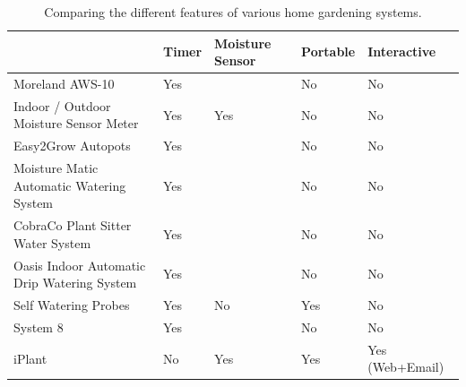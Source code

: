 \documentclass{ubicomp2012}
\begin{document}
\begin{table}
\begin{center}
\renewcommand{\arraystretch}{1.5}
\begin{tabular}{| p{7cm} | p{2cm} |p{2.5cm}  | p{2cm} | p{2cm} |}
\hline
                                                    & Timer                        & Moisture Sensor                        & Portable  & Interactive \\ \hline
        Moreland AWS-10                             & Yes                          & ~                                      & No        & No        \\ \hline
        Indoor / Outdoor Moisture Sensor Meter      & Yes                          & Yes                                    & No        & No         \\ \hline
        Easy2Grow Autopots                          & Yes                          & ~                                      & No        & No         \\ \hline
        Moisture Matic Automatic Watering System    & Yes                          & ~                                      & No        & No         \\ \hline
        CobraCo Plant Sitter Water System           & Yes                          & ~                                      & No        & No         \\ \hline
        Oasis Indoor Automatic Drip Watering System & Yes                          & ~                                      & No        & No         \\ \hline
        Self Watering Probes                        & Yes                          & No                                     & Yes       & No         \\ \hline
        System 8                                    & Yes                          & ~                                      & No        & No         \\ \hline
        iPlant                                      & No                           & Yes                                    & Yes       & Yes (Web+Email)      \\ \hline
\end{tabular}
\caption{Comparing the different features of various home gardening systems.}
\label{tab:Comparison Table}
\end{center}
\end{table}
\end{document}
